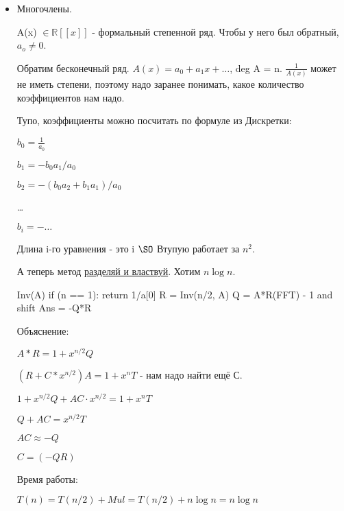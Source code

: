 \begin{itemize}
	\item Многочлены.
	
	A(x) $\in \mathds{R}[[x]]$ - формальный степенной ряд. Чтобы у него был обратный, $a_o \ne 0$.
	
	Обратим бесконечный ряд. $A(x) = a_0 + a_1x + \dots$, deg A = n. $\frac{1}{A(x)}$ может не иметь степени, поэтому надо заранее понимать, какое количество коэффициентов нам надо.
	
	Тупо, коэффициенты можно посчитать по формуле из Дискретки:
	
	$b_0 = \frac{1}{a_0}$
	
	$b_1 = -b_0a_1/a_0$  
	
	$b_2 = -(b_0a_2 + b_1a_1)/a_0$
	
	\dots
	
	$b_i = -\dots$
	
	Длина i-го уравнения - это i $\SO$ Втупую работает за $n^2$.
	
	А теперь метод \underline{разделяй и властвуй}. Хотим $n\log n$.
	
	\begin{cppcode}
Inv(A) {
	if (n == 1): return {1/a[0]}
	R = Inv(n/2, A)
	Q = A*R(FFT) - 1 and shift
	Ans = -Q*R
}	
	\end{cppcode}
	
	Объяснение:
	
	$A*R = 1 + x^{n/2}Q$
	
	$(R + C*x^{n/2})A = 1 + x^nT$ - нам надо найти ещё С.
	
	$1 + x^{n/2}Q + AC\cdot x^{n/2} = 1 + x^nT$
	
	$Q + AC = x^{n/2}T$
	
	$AC \approx -Q$
	
	$C = (-QR)$
	
	Время работы:
	
	$T(n) = T(n/2) + Mul = T(n/2) + n \log n = n \log n$
\end{itemize}



